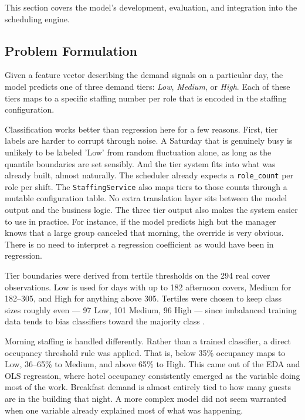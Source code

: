 \documentclass[12pt,a4paper,oneside]{article}
\begin{document}
This section covers the model's development, evaluation, and integration into the scheduling engine.

\subsection{Problem Formulation}


Given a feature vector describing the demand signals on a particular day, the model predicts one of three demand tiers: \textit{Low}, \textit{Medium}, or \textit{High}. Each of these tiers maps to a specific staffing number per role that is encoded in the staffing configuration.
 

Classification works better than regression here for a few reasons. First, tier labels are harder to corrupt through noise. A Saturday that is genuinely busy is unlikely to be labeled 'Low' from random fluctuation alone, as long as the quantile boundaries are set sensibly. And the tier system fits into what was already built, almost naturally. The scheduler already expects a \texttt{role\_count} per role per shift. The \texttt{StaffingService} also maps tiers to those counts through a mutable configuration table. No extra translation layer sits between the model output and the business logic. The three tier output also makes the system easier to use in practice. For instance, if the model predicts high but the manager knows that a large group canceled that morning, the override is very obvious. There is no need to interpret a regression coefficient as would have been in regression.

Tier boundaries were derived from tertile thresholds on the 294 real cover observations. Low is used for days with up to 182 afternoon covers, Medium for 182–305, and High for anything above 305. Tertiles were chosen to keep class sizes roughly even — 97 Low, 101 Medium, 96 High — since imbalanced training data tends to bias classifiers toward the majority class \citep{he2009}.

Morning staffing is handled differently. Rather than a trained classifier, a direct occupancy threshold rule was applied. That is, below 35\% occupancy maps to Low, 36–65\% to Medium, and above 65\% to High. This came out of the EDA and OLS regression, where hotel occupancy consistently emerged as the variable doing most of the work. Breakfast demand is almost entirely tied to how many guests are in the building that night. A more complex model did not seem warranted when one variable already explained most of what was happening.
\end{document}
